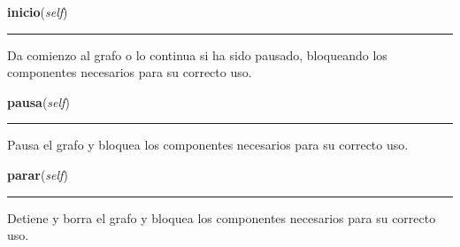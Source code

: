     \label{manejoGrafo:ManejoGrafo:inicio}

    \vspace{0.5ex}

\hspace{.8\funcindent}\begin{boxedminipage}{\funcwidth}

    \raggedright \textbf{inicio}(\textit{self})

    \vspace{-1.5ex}

    \rule{\textwidth}{0.5\fboxrule}
\setlength{\parskip}{2ex}
    Da comienzo al grafo o lo continua si ha sido pausado, bloqueando los 
    componentes necesarios para su correcto uso.

\setlength{\parskip}{1ex}
    \end{boxedminipage}

    \label{manejoGrafo:ManejoGrafo:pausa}

    \vspace{0.5ex}

\hspace{.8\funcindent}\begin{boxedminipage}{\funcwidth}

    \raggedright \textbf{pausa}(\textit{self})

    \vspace{-1.5ex}

    \rule{\textwidth}{0.5\fboxrule}
\setlength{\parskip}{2ex}
    Pausa el grafo y bloquea los componentes necesarios para su correcto 
    uso.

\setlength{\parskip}{1ex}
    \end{boxedminipage}

    \label{manejoGrafo:ManejoGrafo:parar}

    \vspace{0.5ex}

\hspace{.8\funcindent}\begin{boxedminipage}{\funcwidth}

    \raggedright \textbf{parar}(\textit{self})

    \vspace{-1.5ex}

    \rule{\textwidth}{0.5\fboxrule}
\setlength{\parskip}{2ex}
    Detiene y borra el grafo y bloquea los componentes necesarios para su 
    correcto uso.

\setlength{\parskip}{1ex}
    \end{boxedminipage}



